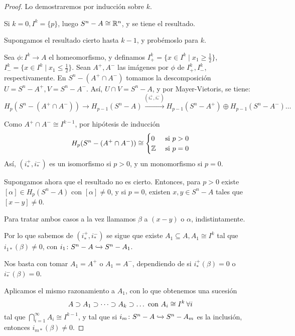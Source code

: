 \begin{proof}
  Lo demostraremos por inducción sobre $k$.

  Si $k = 0, I^k = \{p\}$, luego $S^n - A \cong \mathbb{R}^n$, y se tiene el resultado.

  Supongamos el resultado cierto hasta $k-1$, y probémoslo para $k$.

  Sea $\phi \colon I^k \to A$ el homeomorfismo, y definamos $I_+^k = \{x \in I^k \mid x_1 \geq \frac{1}{2}\}$, \\
  $I_-^k = \{x \in I^k \mid x_1 \leq \frac{1}{2}\}$. Sean $A^+, A^-$ las imágenes por $\phi$ de $I_+^k, I_-^k$,
  respectivamente. En $S^n - (A^+ \cap A^-)$ tomamos la descomposición $U = S^n - A^+, V = S^n - A^-$. Así,
  $U \cap V = S^n - A$, y por Mayer-Vietoris, se tiene:
  \[ H_p(S^n - (A^+ \cap A^-)) \to H_{p-1}(S^n - A) \xrightarrow{(i_*^+, i_*^-)} H_{p-1}(S^n - A^+) \oplus H_{p-1}(S^n - A^-) \dots \]

  Como $A^+ \cap A^- \cong I^{k-1}$, por hipótesis de inducción \\
  \[H_p(S^n - (A^+ \cap A^-)) \cong \begin{cases} 0 &\text{ si } p > 0 \\
                                                \mathbb{Z} &\text{ si } p = 0 \end{cases}\]
  Así, $(i_*^+, i_*^-)$ es un isomorfismo si $p > 0$, y un monomorfismo si $p = 0$.

  Supongamos ahora que el resultado no es cierto. Entonces, para $p > 0$ existe $[\alpha] \in H_p(S^n - A)$ con $[\alpha] \neq 0$, y
  si $p = 0$, existen $x, y \in S^n - A$ tales que $[x-y] \neq 0$.

  Para tratar ambos casos a la vez llamamos $\beta$ a $(x-y)$ o $\alpha$, indistintamente.

  Por lo que sabemos de $(i_*^+, i_*^-)$ se sigue que existe $A_1 \subseteq A, A_1 \cong I^k$ tal que
  $i_{1*}(\beta) \neq 0$, con $i_1 \colon S^n - A \xhookrightarrow{} S^n - A_1$.

  Nos basta con tomar $A_1 = A^+$ o $A_1 = A^-$, dependiendo de si $i_*^+(\beta) = 0$ o $i_*^-(\beta) = 0$.

  Aplicamos el mismo razonamiento a $A_1$, con lo que obtenemos una sucesión
  \[ A \supset A_1 \supset \dots \supset A_k \supset \dots \text{ con } A_i \cong I^k \hspace{0.2em} \forall i \]
  tal que $\bigcap\limits_{i = 1}^\infty A_i \cong I^{k-1}$, y tal que si $i_m \colon S^n - A \xhookrightarrow{} S^n - A_m$
  es la inclusión, entonces $i_{m*}(\beta) \neq 0$.


\end{proof}
